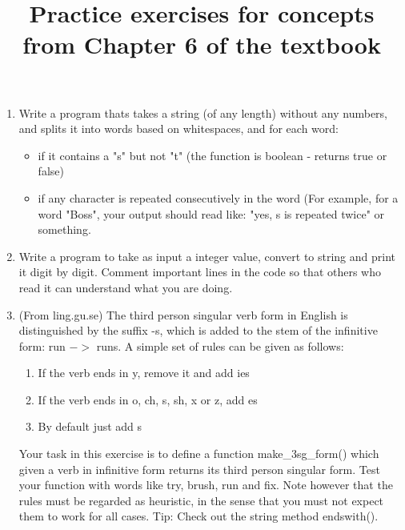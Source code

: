 \documentclass[10pt,a4paper]{article}
\title{Practice exercises for concepts from Chapter 6 of the textbook}
\begin{document}
\maketitle

\begin{enumerate}
\item Write a program thats takes a string (of any length) without any numbers, and splits it into words based on whitespaces, and for each word:
\begin{itemize}
\item if it contains a "s" but not "t" (the function is boolean - returns true or false)
\item if any character is repeated consecutively in the word (For example, for a word "Boss", your output should read like: "yes, s is repeated twice" or something.
\end{itemize}

\item Write a program to take as input a integer value, convert to string and print it digit by digit. Comment important lines in the code 
so that others who read it can understand what you are doing.

\item (From ling.gu.se) The third person singular verb form in English is distinguished by the suffix -s, which is added to the stem of the infinitive form: run $->$ runs. A simple set of rules can be given as follows:
\begin{enumerate}
\item If the verb ends in y, remove it and add ies
\item If the verb ends in o, ch, s, sh, x or z, add es
\item By default just add s
\end{enumerate}
Your task in this exercise is to define a function make\_3sg\_form() which given a verb in infinitive form returns its third person singular form. Test your function with words like try, brush, run and fix. Note however that the rules must be regarded as heuristic, in the sense that you must not expect them to work for all cases. Tip: Check out the string method endswith().

\end{enumerate}
\end{document}
